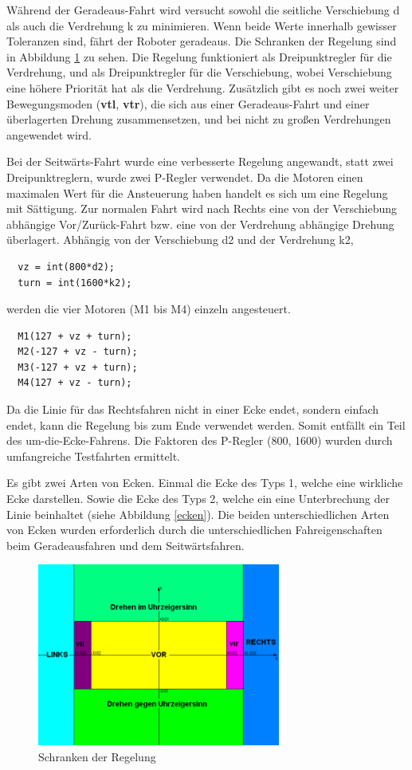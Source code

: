 \documentclass[a4paper,bibtotoc,oneside]{scrbook}
\begin{document}
Während der Geradeaus-Fahrt wird versucht sowohl die seitliche Verschiebung d als auch die Verdrehung k zu minimieren. Wenn beide Werte innerhalb gewisser Toleranzen sind, fährt der Roboter geradeaus. Die Schranken der Regelung sind in Abbildung \ref{schr} zu sehen. Die Regelung funktioniert als Dreipunktregler für die Verdrehung, und als Dreipunktregler für die Verschiebung, wobei Verschiebung eine höhere Priorität hat als die Verdrehung. Zusätzlich gibt es noch zwei weiter Bewegungsmoden (\textbf{vtl}, \textbf{vtr}), die sich aus einer Geradeaus-Fahrt und einer überlagerten Drehung zusammensetzen, und bei nicht zu großen Verdrehungen angewendet wird.

Bei der Seitwärts-Fahrt wurde eine verbesserte Regelung angewandt, statt zwei Dreipunktreglern, wurde zwei P-Regler verwendet. Da die Motoren einen maximalen Wert für die Ansteuerung haben handelt es sich um eine Regelung mit Sättigung. Zur normalen Fahrt wird nach Rechts eine von der Verschiebung abhängige Vor/Zurück-Fahrt bzw. eine von der Verdrehung abhängige Drehung überlagert.
Abhängig von der Verschiebung d2 und der Verdrehung k2,
\begin{verbatim}
  vz = int(800*d2);
  turn = int(1600*k2);
\end{verbatim}
werden die vier Motoren (M1 bis M4) einzeln angesteuert.
\begin{verbatim}
  M1(127 + vz + turn);
  M2(-127 + vz - turn);
  M3(-127 + vz + turn);
  M4(127 + vz - turn); 
\end{verbatim}

Da die Linie für das Rechtsfahren nicht in einer Ecke endet, sondern einfach endet, kann die Regelung bis zum Ende verwendet werden. Somit entfällt ein Teil des um-die-Ecke-Fahrens. Die Faktoren des P-Regler (800, 1600) wurden durch umfangreiche Testfahrten ermittelt.

Es gibt zwei Arten von Ecken. Einmal die Ecke des Typs 1, welche eine wirkliche Ecke darstellen. Sowie die Ecke des Typs 2, welche ein eine Unterbrechung der Linie beinhaltet (siehe Abbildung \ref{ecken}).
Die beiden unterschiedlichen Arten von Ecken wurden erforderlich durch die unterschiedlichen Fahreigenschaften beim Geradeausfahren und dem Seitwärtsfahren.





\begin{figure}[htbp]
\centering
\includegraphics[width=80mm]{img/schranken.png}
\caption{Schranken der Regelung}\label{schr}
\end{figure}
\end{document}
